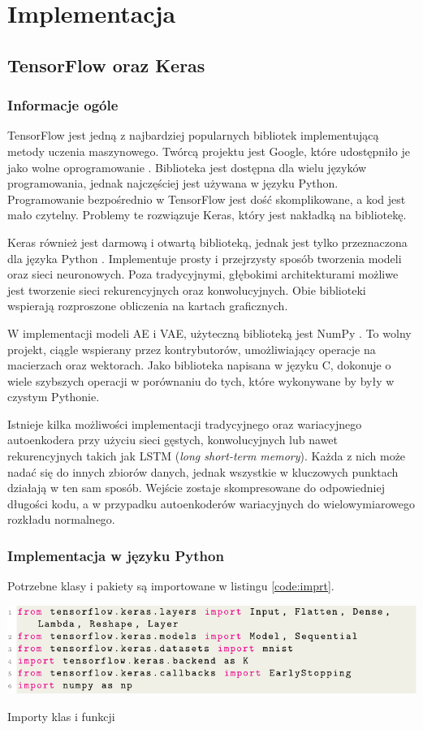 \documentclass[a4paper,12pt,oneside]{book} %
\begin{document}
\chapter{Implementacja}
\section{TensorFlow oraz Keras}
\subsection{Informacje ogóle}
TensorFlow jest jedną z najbardziej popularnych bibliotek implementującą metody uczenia maszynowego. Twórcą projektu jest Google, które udostępniło je jako wolne oprogramowanie \cite{tensorflow2015-whitepaper}. Biblioteka jest dostępna dla wielu języków programowania, jednak najczęściej jest używana w języku Python. Programowanie bezpośrednio w TensorFlow jest dość skomplikowane, a kod jest mało czytelny. Problemy te rozwiązuje Keras, który jest nakładką na bibliotekę. 

Keras również jest darmową i otwartą biblioteką, jednak jest tylko przeznaczona dla języka Python \cite{chollet2015keras}. Implementuje prosty i przejrzysty sposób tworzenia modeli oraz sieci  neuronowych. Poza tradycyjnymi, głębokimi architekturami możliwe jest tworzenie sieci rekurencyjnych oraz konwolucyjnych. Obie biblioteki wspierają rozproszone obliczenia na kartach graficznych. 

W implementacji modeli AE i VAE, użyteczną biblioteką jest NumPy \cite{numpy}. To wolny projekt, ciągle wspierany przez kontrybutorów, umożliwiający operacje na macierzach oraz wektorach. Jako biblioteka napisana w języku C, dokonuje o wiele szybszych operacji w porównaniu do tych, które wykonywane by były w czystym Pythonie. 

Istnieje kilka możliwości implementacji tradycyjnego oraz wariacyjnego autoenkodera przy użyciu sieci gęstych, konwolucyjnych lub nawet rekurencyjnych takich jak LSTM (\textit{long short-term memory}). Każda z nich może nadać się do innych zbiorów danych, jednak wszystkie w kluczowych punktach działają w ten sam sposób. Wejście zostaje skompresowane do odpowiedniej długości kodu, a w przypadku autoenkoderów wariacyjnych do wielowymiarowego rozkładu normalnego. 
\subsection{Implementacja w języku Python}
Potrzebne klasy i pakiety są importowane w listingu \ref{code:imprt}.
\begin{code}[h!]
	\centering
	\includegraphics[width=\linewidth]{importy.pdf}
	\caption{Importy klas i funkcji}
	\label{code:imprt}
\end{code}
\end{document}
